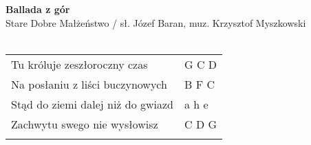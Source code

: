 \documentclass[a5paper]{article}
\begin{document}


\noindent
\fontsize{12pt}{15pt}\selectfont
\textbf{Ballada z gór} \\
\fontsize{8pt}{10pt}\selectfont
Stare Dobre Małżeństwo / sł. Józef Baran, muz. Krzysztof Myszkowski \\ \\
\fontsize{10pt}{12pt}\selectfont

\begin{tabular}{@{}p{8cm}p{3cm}@{}}
\noindent
Tu króluje zeszłoroczny czas & G C D \\
Na posłaniu z liści buczynowych & B F C \\
Stąd do ziemi dalej niż do gwiazd & a h e \\
Zachwytu swego nie wysłowisz & C D G \\ \\
\end{tabular}
\end{document}
